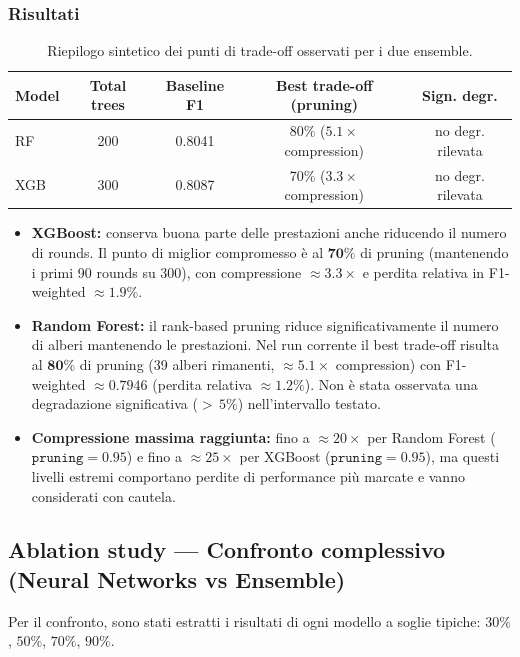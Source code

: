 \documentclass[a4paper,12pt]{report}
\begin{document}
	\subsubsection{Risultati}
	\begin{table}[H]
		\centering
		\setlength{\tabcolsep}{4pt}
		\begin{tabular}{lcccc}
			\toprule
			\textbf{Model} & \textbf{Total trees} & \textbf{Baseline F1} & \textbf{Best trade-off (pruning)} & \textbf{Sign. degr.} \\
			\midrule
			RF     & 200 & 0.8041 & 80\% (\(5.1\times\) compression) & no degr. rilevata \\
			XGB    & 300 & 0.8087 & 70\% (\(3.3\times\) compression) & no degr. rilevata \\
			\bottomrule
		\end{tabular}
		\caption{Riepilogo sintetico dei punti di trade-off osservati per i due ensemble.}
	\end{table}
	
	\begin{itemize}
		\item \textbf{XGBoost:} conserva buona parte delle prestazioni anche riducendo il numero di rounds. Il punto di miglior compromesso è al \(\mathbf{70\%}\) di pruning (mantenendo i primi 90 rounds su 300), con compressione \(\approx 3.3\times\) e perdita relativa in F1-weighted \(\approx 1.9\%\).
		\item \textbf{Random Forest:} il rank-based pruning riduce significativamente il numero di alberi mantenendo le prestazioni. Nel run corrente il best trade-off risulta al \(\mathbf{80\%}\) di pruning (39 alberi rimanenti, \(\approx 5.1\times\) compression) con F1-weighted \(\approx 0.7946\) (perdita relativa \(\approx 1.2\%\)). Non è stata osservata una degradazione significativa (\(>\,5\%\)) nell'intervallo testato.
		\item \textbf{Compressione massima raggiunta:} fino a \(\approx 20\times\) per Random Forest (\(\texttt{pruning}=0.95\)) e fino a \(\approx 25\times\) per XGBoost (\(\texttt{pruning}=0.95\)), ma questi livelli estremi comportano perdite di performance più marcate e vanno considerati con cautela.
	\end{itemize}
	
	\subsection{Ablation study — Confronto complessivo (Neural Networks vs Ensemble)}
	Per il confronto, sono stati estratti i risultati di ogni modello a soglie tipiche: \(30\%\), \(50\%\), \(70\%\), \(90\%\).
	
\end{document}
